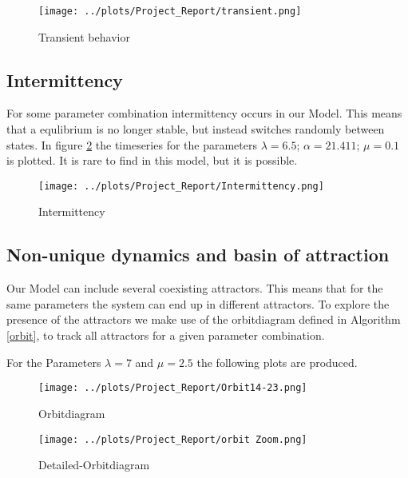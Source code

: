 \documentclass[a4paper,12pt, twoside]{article} %
\begin{document}
\begin{figure}[H]
\begin{centering}
\texttt{[image: ../plots/Project\_Report/transient.png]}
\caption{Transient behavior}\label{fig:transient}
\end{centering}
\end{figure}

\subsection{Intermittency}

For some parameter combination intermittency occurs in our Model. 
This means that a equlibrium is no longer stable, but instead switches randomly between states. 
In figure \ref{fig:intermittency} the timeseries for the parameters $\lambda=6.5$; $\alpha = 21.411 $; $ \mu = 0.1$ is plotted.
It is rare to find in this model, but it is possible. 
\begin{figure}[H]
\begin{centering}
\texttt{[image: ../plots/Project\_Report/Intermittency.png]}
\caption{Intermittency}\label{fig:intermittency}
\end{centering}
\end{figure}

\subsection{Non-unique dynamics and basin of attraction}

Our Model can include several coexisting attractors. This means that for the same parameters the system can end up in different attractors. To explore the presence of the attractors we 
make use of the orbitdiagram defined in Algorithm \ref{orbit}, to track all attractors for a given parameter combination. 

For the Parameters $\lambda = 7$ and $\mu = 2.5$ the following plots are produced.

\begin{figure}[H]
  \begin{centering}
    \texttt{[image: ../plots/Project\_Report/Orbit14-23.png]} 
    \caption{Orbitdiagram}
    \label{fig:Orbitdiagram}
  \end{centering}
\end{figure}

\begin{figure}[H]
  \begin{centering}
    \texttt{[image: ../plots/Project\_Report/orbit Zoom.png]} 
    \caption{Detailed-Orbitdiagram}
    \label{fig:Orbitdiagram2}
  \end{centering}
\end{figure}
\end{document}
